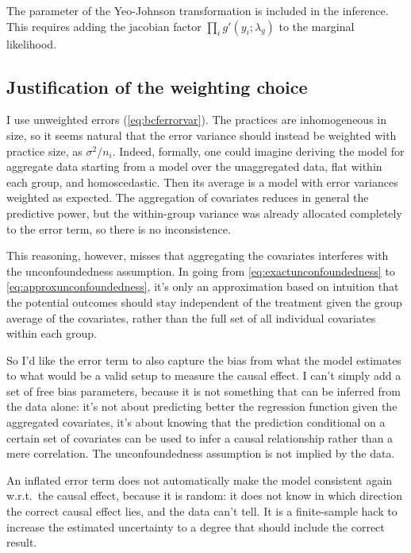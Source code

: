 \documentclass[a4paper]{article}
\theoremstyle{definition}
\begin{document}
    The parameter of the Yeo-Johnson transformation is included in the inference. This requires adding the jacobian factor $\prod_i g'(y_i;\lambda_g)$ to the marginal likelihood.

    \subsection{Justification of the weighting choice}

    I use unweighted errors (\autoref{eq:bcferrorvar}). The practices are inhomogeneous in size, so it seems natural that the error variance should instead be weighted with practice size, as $\sigma^2/n_i$. Indeed, formally, one could imagine deriving the model for aggregate data starting from a model over the unaggregated data, flat within each group, and homoscedastic. Then its average is a model with error variances weighted as expected. The aggregation of covariates reduces in general the predictive power, but the within-group variance was already allocated completely to the error term, so there is no inconsistence.

    This reasoning, however, misses that aggregating the covariates interferes with the unconfoundedness assumption. In going from \autoref{eq:exactunconfoundedness} to \autoref{eq:approxunconfoundedness}, it's only an approximation based on intuition that the potential outcomes should stay independent of the treatment given the group average of the covariates, rather than the full set of all individual covariates within each group.

    So I'd like the error term to also capture the bias from what the model estimates to what would be a valid setup to measure the causal effect. I can't simply add a set of free bias parameters, because it is not something that can be inferred from the data alone: it's not about predicting better the regression function given the aggregated covariates, it's about knowing that the prediction conditional on a certain set of covariates can be used to infer a causal relationship rather than a mere correlation. The unconfoundedness assumption is not implied by the data.

    An inflated error term does not automatically make the model consistent again w.r.t.\ the causal effect, because it is random: it does not know in which direction the correct causal effect lies, and the data can't tell. It is a finite-sample hack to increase the estimated uncertainty to a degree that should include the correct result.
\end{document}
